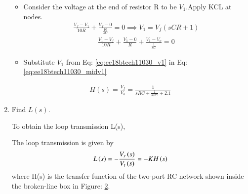 \begin{enumerate}[label=\arabic*.,ref=\theenumi]
\begin{figure}[!ht]
	\begin{center}
		\resizebox{\columnwidth/1}{!}{}
	\end{center}
	\caption{}
	\label{fig:ee18btech11030_figure}
\end{figure}
\begin{itemize}
\item Consider the voltage at the end of resistor R to be $V_1$.Apply KCL at nodes.   
\begin{align}
\frac{V_f-V_1}{10R}+\frac{V_f-0}{\frac{10}{sC}} = 0
\implies V_1 = V_f(sCR+1)
\label{eq:ee18btech11030_v1}
\end{align}
\begin{align}
    \frac{V_1 - V_f}{10R} + \frac{V_1 - 0}{R} + \frac{V_1 - V_o}{\frac{1}{sC}} = 0
    \label{eq:ee18btech11030_midv1}
\end{align}
\item Substitute $V_1$ from Eq: \ref{eq:ee18btech11030_v1} in Eq: \ref{eq:ee18btech11030_midv1}
\end{itemize}
\begin{align}
    H(s) = \frac{V_f}{V_o} = \frac{1}{sRC + \frac{1}{sRC} + 2.1}
\end{align}

\item Find $L(s)$.

\solution To obtain the loop transmission L(s),

\begin{figure}[!ht]
	\begin{center}
		\resizebox{\columnwidth/1}{!}{}
	\end{center}
	\caption{}
	\label{fig:ee18btech11030_fig1}
\end{figure}

The loop transmission is given by
\begin{align}
    L\brak{s} = -\frac{V_r\brak{s}}{V_t\brak{s}} = -KH\brak{s}
\label{eq:ee18btech11030}
\end{align}
where H(s) is the transfer function of the two-port RC network shown inside the broken-line box in Figure: \ref{fig:ee18btech11030_fig1}.


\end{enumerate}
